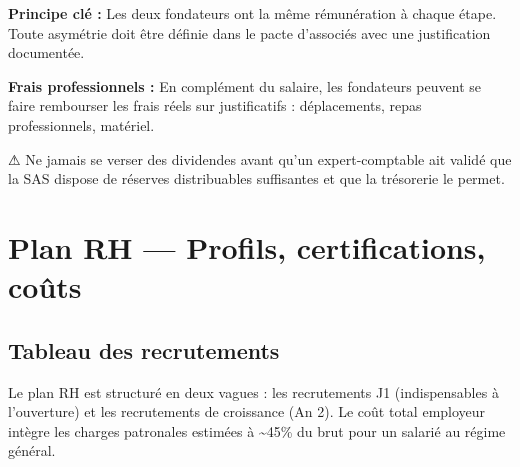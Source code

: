 \documentclass[11pt, a4paper]{article}
\newcommand{\eyebrow}[1]{%
  \vspace{4pt}{\small\color{fc-ink3}\texttt{— #1}}\vspace{2pt}
}
\begin{document}
\textbf{Principe clé :} Les deux fondateurs ont la même rémunération à chaque étape. Toute asymétrie doit être définie dans le pacte d'associés avec une justification documentée.

\textbf{Frais professionnels :} En complément du salaire, les fondateurs peuvent se faire rembourser les frais réels sur justificatifs : déplacements, repas professionnels, matériel.

\begin{warnbox}
⚠ Ne jamais se verser des dividendes avant qu'un expert-comptable ait validé que la SAS dispose de réserves distribuables suffisantes et que la trésorerie le permet.
\end{warnbox}

\section{Plan RH — Profils, certifications, coûts}
\eyebrow{C — PLAN RH}

\subsection{Tableau des recrutements}

Le plan RH est structuré en deux vagues : les recrutements J1 (indispensables à l'ouverture) et les recrutements de croissance (An 2). Le coût total employeur intègre les charges patronales estimées à \textasciitilde45\% du brut pour un salarié au régime général.
\end{document}
